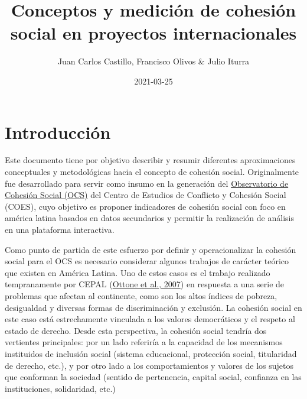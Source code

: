 \documentclass[
  12pt,
]{book}
\title{Conceptos y medición de cohesión social en proyectos internacionales}
\author{Juan Carlos Castillo, Francisco Olivos \& Julio Iturra}
\date{2021-03-25}
\begin{document}
\maketitle

{
\hypersetup{linkcolor=}
\setcounter{tocdepth}{1}
\tableofcontents
}
\listoftables
\listoffigures
{}
\hypertarget{introducciuxf3n}{%
\chapter{Introducción}\label{introducciuxf3n}}

Este documento tiene por objetivo describir y resumir diferentes aproximaciones conceptuales y metodológicas hacia el concepto de cohesión social. Originalmente fue desarrollado para servir como insumo en la generación del \href{https://ocs-coes.netlify.app/}{Observatorio de Cohesión Social (OCS)} del Centro de Estudios de Conflicto y Cohesión Social (COES), cuyo objetivo es proponer indicadores de cohesión social con foco en américa latina basados en datos secundarios y permitir la realización de análisis en una plataforma interactiva.

Como punto de partida de este esfuerzo por definir y operacionalizar la cohesión social para el OCS es necesario considerar algunos trabajos de carácter teórico que existen en América Latina. Uno de estos casos es el trabajo realizado tempranamente por CEPAL (\protect\hyperlink{ref-ottone2007cohesion}{Ottone et al., 2007}) en respuesta a una serie de problemas que afectan al continente, como son los altos índices de pobreza, desigualdad y diversas formas de discriminación y exclusión. La cohesión social en este caso está estrechamente vinculada a los valores democráticos y el respeto al estado de derecho. Desde esta perspectiva, la cohesión social tendría dos vertientes principales: por un lado referiría a la capacidad de los mecanismos instituidos de inclusión social (sistema educacional, protección social, titularidad de derecho, etc.), y por otro lado a los comportamientos y valores de los sujetos que conforman la sociedad (sentido de pertenencia, capital social, confianza en las instituciones, solidaridad, etc.)
\end{document}

